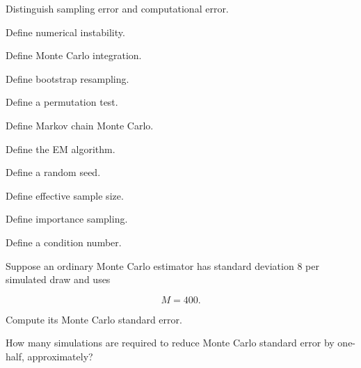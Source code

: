 \begin{exercise}[1]
Distinguish sampling error and computational error.
\end{exercise}

\begin{exercise}[1]
Define numerical instability.
\end{exercise}

\begin{exercise}[1]
Define Monte Carlo integration.
\end{exercise}

\begin{exercise}[1]
Define bootstrap resampling.
\end{exercise}

\begin{exercise}[1]
Define a permutation test.
\end{exercise}

\begin{exercise}[1]
Define Markov chain Monte Carlo.
\end{exercise}

\begin{exercise}[1]
Define the EM algorithm.
\end{exercise}

\begin{exercise}[1]
Define a random seed.
\end{exercise}

\begin{exercise}[1]
Define effective sample size.
\end{exercise}

\begin{exercise}[1]
Define importance sampling.
\end{exercise}

\begin{exercise}[1]
Define a condition number.
\end{exercise}

\begin{exercise}[2]
Suppose an ordinary Monte Carlo estimator has standard deviation \(8\)
per simulated draw and uses

\[
M=400.
\]

Compute its Monte Carlo standard error.
\end{exercise}

\begin{exercise}[2]
How many simulations are required to reduce Monte Carlo standard error by
one-half, approximately?
\end{exercise}

